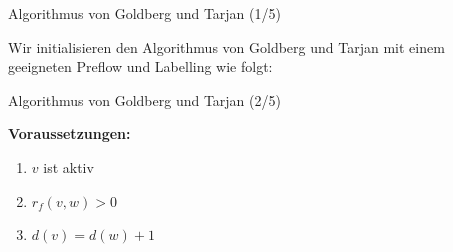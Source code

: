 \documentclass[aspectratio=169]{beamer}
\begin{document}
\begin{frame}{Algorithmus von Goldberg und Tarjan (1/5)}

  Wir initialisieren den Algorithmus von Goldberg und Tarjan mit einem
  geeigneten Preflow und Labelling wie folgt:

  \begin{algorithmus*}
    \begin{algorithm}[H]
      \begin{algorithmic}[1]
          \State {}
          \EndProcedure
      \end{algorithmic}
    \end{algorithm}
  \end{algorithmus*}
  
\end{frame}

\begin{frame}{Algorithmus von Goldberg und Tarjan (2/5)}

  \begin{algorithmus*}
    \begin{algorithm}[H]
      \begin{algorithmic}[1]
          \EndProcedure
      \end{algorithmic}
      \textbf{Voraussetzungen:} 
        \begin{enumerate}
          \item $v$ ist aktiv
          \item $r_f(v,w) > 0$
          \item $d(v) = d(w) + 1$
        \end{enumerate}
    \end{algorithm}
  \end{algorithmus*}
  
\end{frame}
\end{document}
